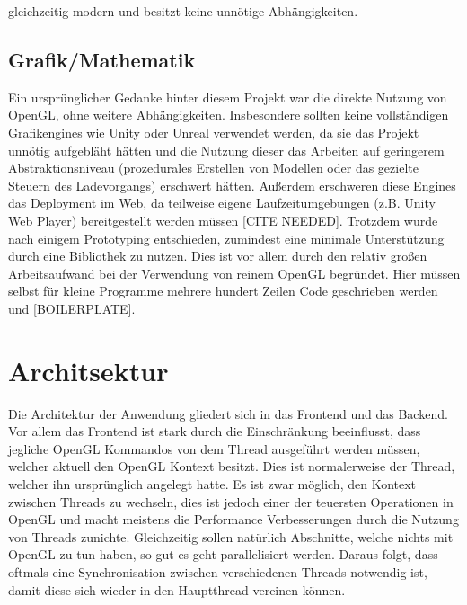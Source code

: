 gleichzeitig modern und besitzt keine unnötige Abhängigkeiten.

\subsection{Grafik/Mathematik}
Ein ursprünglicher Gedanke hinter diesem Projekt war die direkte Nutzung von OpenGL, ohne weitere Abhängigkeiten. Insbesondere sollten keine vollständigen Grafikengines wie Unity oder Unreal verwendet werden, da sie das Projekt unnötig aufgebläht hätten und die Nutzung dieser das Arbeiten auf geringerem Abstraktionsniveau (prozedurales Erstellen von Modellen oder das gezielte Steuern des Ladevorgangs) erschwert hätten. Außerdem erschweren diese Engines das Deployment im Web, da teilweise eigene Laufzeitumgebungen (z.B. Unity Web Player) bereitgestellt werden müssen [CITE NEEDED]. Trotzdem wurde nach einigem Prototyping entschieden, zumindest eine minimale Unterstützung durch eine Bibliothek zu nutzen. Dies ist vor allem durch den relativ großen Arbeitsaufwand bei der Verwendung von reinem OpenGL begründet. Hier müssen selbst für kleine Programme mehrere hundert Zeilen Code geschrieben werden und [BOILERPLATE].



\section{Architsektur}
Die Architektur der Anwendung gliedert sich in das Frontend und das Backend. Vor allem das Frontend ist stark durch die Einschränkung beeinflusst, dass jegliche OpenGL Kommandos von dem Thread ausgeführt werden müssen, welcher aktuell den OpenGL Kontext besitzt. Dies ist normalerweise der Thread, welcher ihn ursprünglich angelegt hatte. Es ist zwar möglich, den Kontext zwischen Threads zu wechseln, dies ist jedoch einer der teuersten Operationen in OpenGL und macht meistens die Performance Verbesserungen durch die Nutzung von Threads zunichte. Gleichzeitig sollen natürlich Abschnitte, welche nichts mit OpenGL zu tun haben, so gut es geht parallelisiert werden. Daraus folgt, dass oftmals eine Synchronisation zwischen verschiedenen Threads notwendig ist, damit diese sich wieder in den Hauptthread vereinen können.

